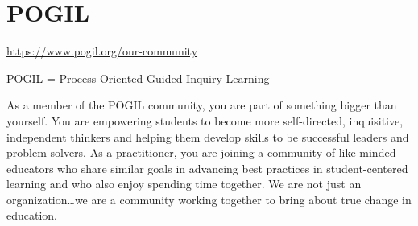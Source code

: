 \documentclass[11pt]{article}
\begin{document}
\section*{POGIL}
\label{sec:org884c771}
\url{https://www.pogil.org/our-community}

POGIL = Process-Oriented Guided-Inquiry Learning

As a member of the POGIL community, you are part of something bigger than yourself.  You are empowering students to become more self-directed, inquisitive, independent thinkers  and helping them develop skills to be successful leaders and problem solvers. As a practitioner, you are joining a community of like-minded educators who share similar goals in advancing best practices in student-centered learning and who also enjoy spending time together. We are not just an organization\ldots{}we are a community working together to bring about true change in education.
\end{document}
